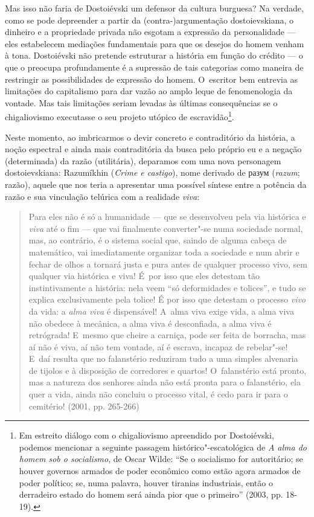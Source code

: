 Mas isso não faria de Dostoiévski um defensor da cultura burguesa? Na
verdade, como se pode depreender a partir da \mbox{(contra-)argumentação}
dostoievskiana, o dinheiro e a propriedade privada não esgotam a
expressão da personalidade --- eles estabelecem mediações fundamentais
para que os desejos do homem venham à tona. Dostoiévski não pretende
estruturar a história em função do crédito --- o que o preocupa
profundamente é a supressão de tais categorias como maneira de
restringir as possibilidades de expressão do homem. O~escritor bem
entrevia as limitações do capitalismo para dar vazão ao amplo leque de
fenomenologia da vontade. Mas tais limitações seriam levadas às últimas
consequências se o chigaliovismo executasse o seu projeto utópico de
escravidão\footnote{Em estreito diálogo com o chigaliovismo apreendido
  por Dostoiévski, podemos mencionar a seguinte passagem
  histórico"-escatológica de \emph{A alma do homem sob o socialismo}, de
  Oscar Wilde: ``Se o socialismo for autoritário; se houver governos
  armados de poder econômico como estão agora armados de poder político;
  se, numa palavra, houver tiranias industriais, então o derradeiro
  estado do homem será ainda pior que o primeiro'' (2003, pp. 18-19).}.

Neste momento, ao imbricarmos o devir concreto e contraditório da
história, a noção espectral e ainda mais contraditória da busca pelo
próprio eu e a negação (determinada) da razão (utilitária), deparamos
com uma nova personagem dostoievskiana: Razumíkhin (\emph{Crime e
castigo}), nome derivado de
разум (\emph{razum};
razão), aquele que nos teria a apresentar uma possível síntese entre a
potência da razão e sua vinculação telúrica com a realidade \emph{viva}:

\begin{quote}
Para eles não é só a humanidade --- que se desenvolveu pela via histórica
e \emph{viva} até o fim --- que vai finalmente converter"-se numa
sociedade normal, mas, ao contrário, é o sistema social que, saindo de
alguma cabeça de matemático, vai imediatamente organizar toda a
sociedade e num abrir e fechar de olhos a tornará justa e pura antes de
qualquer processo vivo, sem qualquer via histórica e viva! É~por isso
que eles detestam tão instintivamente a história: nela veem ``só
deformidades e tolices'', e tudo se explica exclusivamente pela tolice!
É por isso que detestam o processo \emph{vivo} da vida: a \emph{alma
viva} é dispensável! A~alma viva exige vida, a alma viva não obedece à
mecânica, a alma viva é desconfiada, a alma viva é retrógrada! E~mesmo
que cheire a carniça, pode ser feita de borracha, mas aí não é viva, aí
não tem vontade, aí é escrava, incapaz de rebelar"-se! E~daí resulta que
no falanstério reduziram tudo a uma simples alvenaria de tijolos e à
disposição de corredores e quartos! O~falanstério está pronto, mas a
natureza dos senhores ainda não está pronta para o falanstério, ela quer
a vida, ainda não concluiu o processo vital, é cedo para ir para o
cemitério! (2001, pp. 265-266)
\end{quote}

